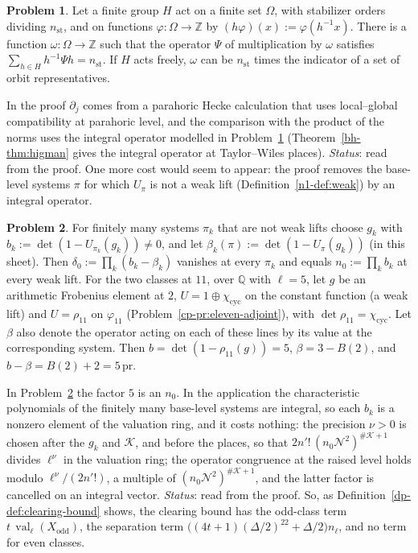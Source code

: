 \documentclass[reqno]{amsart}
\theoremstyle{definition}
\newtheorem{problem}{Problem}[section]
\theoremstyle{plain}
\newcommand{\Z}{\mathbb{Z}}
\newcommand{\Q}{\mathbb{Q}}
\newcommand{\Kc}{\mathcal{K}}
\newcommand{\cyc}{\chi_{\mathrm{cyc}}}
\newcommand{\val}{\operatorname{val}}
\begin{document}
\begin{problem}\label{pr:transversal}
Let a finite group \(H\) act on a finite set \(\Omega\), with stabilizer orders dividing \(n_{\mathrm{st}}\), and on functions \(\varphi \colon \Omega \to \Z\) by \((h\varphi)(x) := \varphi(h^{-1}x)\).  There is a function \(\omega \colon \Omega \to \Z\) such that the operator \(\Psi\) of multiplication by \(\omega\) satisfies \(\sum_{h \in H} h^{-1}\Psi h = n_{\mathrm{st}}\).  If \(H\) acts freely, \(\omega\) can be \(n_{\mathrm{st}}\) times the indicator of a set of orbit representatives.
\end{problem}

In the proof \(\partial_j\) comes from a parahoric Hecke calculation that uses local--global compatibility at parahoric level, and the comparison with the product of the norms uses the integral operator modelled in Problem~\ref{pr:transversal} (Theorem~\ref{bh-thm:higman} gives the integral operator at Taylor--Wiles places).  \emph{Status}: read from the proof.  One more cost would seem to appear: the proof removes the base-level systems \(\pi\) for which \(U_\pi\) is not a weak lift (Definition~\ref{n1-def:weak}) by an integral operator.

\begin{problem}\label{pr:weak}
For finitely many systems \(\pi_k\) that are not weak lifts choose \(g_k\) with \(b_k := \det(1 - U_{\pi_k}(g_k)) \ne 0\), and let \(\beta_k(\pi) := \det(1 - U_\pi(g_k))\) (in this sheet).  Then \(\delta_0 := \prod_k(b_k - \beta_k)\) vanishes at every \(\pi_k\) and equals \(n_0 := \prod_k b_k\) at every weak lift.  For the two classes at \(11\), over \(\Q\) with \(\ell = 5\), let \(g\) be an arithmetic Frobenius element at \(2\), \(U = 1 \oplus \cyc\) on the constant function (a weak lift) and \(U = \rho_{11}\) on \(\varphi_{11}\) (Problem~\ref{cp-pr:eleven-adjoint}), with \(\det\rho_{11} = \cyc\).  Let \(\beta\) also denote the operator acting on each of these lines by its value at the corresponding system.  Then \(b = \det(1 - \rho_{11}(g)) = 5\), \(\beta = 3 - B(2)\), and \(b - \beta = B(2) + 2 = 5\,\mathrm{pr}\).
\end{problem}

In Problem~\ref{pr:weak} the factor \(5\) is an \(n_0\).  In the application the characteristic polynomials of the finitely many base-level systems are integral, so each \(b_k\) is a nonzero element of the valuation ring, and it costs nothing: the precision \(\nu > 0\) is chosen after the \(g_k\) and \(\Kc\), and before the places, so that \(2n'!\,(n_0\mathcal N^2)^{\#\Kc+1}\) divides \(\ell^\nu\) in the valuation ring; the operator congruence at the raised level holds modulo \(\ell^\nu/(2n'!)\), a multiple of \((n_0\mathcal N^2)^{\#\Kc+1}\), and the latter factor is cancelled on an integral vector.  \emph{Status}: read from the proof.  So, as Definition~\ref{dp-def:clearing-bound} shows, the clearing bound has the odd-class term \(t\,\val_\ell(X_{\mathrm{odd}})\), the separation term \(\bigl((4t+1)(\Delta/2)^{22} + \Delta/2\bigr)n_\ell\), and no term for even classes.
\end{document}
